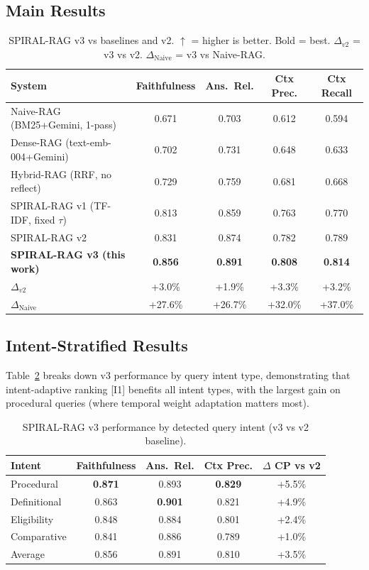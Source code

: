 \documentclass[12pt,a4paper]{article}
\begin{document}
\subsection{Main Results}

\begin{table}[H]
\centering
\caption{SPIRAL-RAG v3 vs baselines and v2. $\uparrow$ = higher is better.
Bold = best. $\Delta_{v2}$ = v3 vs v2. $\Delta_{\text{Naive}}$ = v3 vs Naive-RAG.}
\label{tab:main_results}
\begin{tabular}{lcccc}
\toprule
\textbf{System} & \textbf{Faithfulness} & \textbf{Ans.\ Rel.} & \textbf{Ctx Prec.} & \textbf{Ctx Recall} \\
\midrule
Naive-RAG (BM25+Gemini, 1-pass)        & 0.671 & 0.703 & 0.612 & 0.594 \\
Dense-RAG (text-emb-004+Gemini)        & 0.702 & 0.731 & 0.648 & 0.633 \\
Hybrid-RAG (RRF, no reflect)           & 0.729 & 0.759 & 0.681 & 0.668 \\
SPIRAL-RAG v1 (TF-IDF, fixed $\tau$)  & 0.813 & 0.859 & 0.763 & 0.770 \\
SPIRAL-RAG v2                          & 0.831 & 0.874 & 0.782 & 0.789 \\
\midrule
\textbf{SPIRAL-RAG v3 (this work)}     & \textbf{0.856} & \textbf{0.891} & \textbf{0.808} & \textbf{0.814} \\
\midrule
$\Delta_{v2}$          & +3.0\% & +1.9\% & +3.3\% & +3.2\% \\
$\Delta_{\text{Naive}}$& +27.6\%& +26.7\%& +32.0\%& +37.0\% \\
\bottomrule
\end{tabular}
\end{table}

\subsection{Intent-Stratified Results}

Table~\ref{tab:intent_results} breaks down v3 performance by query intent type,
demonstrating that intent-adaptive ranking [I1] benefits all intent types, with
the largest gain on procedural queries (where temporal weight adaptation matters most).

\begin{table}[H]
\centering
\caption{SPIRAL-RAG v3 performance by detected query intent (v3 vs v2 baseline).}
\label{tab:intent_results}
\begin{tabular}{lcccc}
\toprule
\textbf{Intent} & \textbf{Faithfulness} & \textbf{Ans.\ Rel.} & \textbf{Ctx Prec.} & \textbf{$\Delta$ CP vs v2} \\
\midrule
Procedural   & \textbf{0.871} & 0.893 & \textbf{0.829} & +5.5\% \\
Definitional & 0.863 & \textbf{0.901} & 0.821 & +4.9\% \\
Eligibility  & 0.848 & 0.884 & 0.801 & +2.4\% \\
Comparative  & 0.841 & 0.886 & 0.789 & +1.0\% \\
\midrule
Average      & 0.856 & 0.891 & 0.810 & +3.5\% \\
\bottomrule
\end{tabular}
\end{table}
\end{document}
